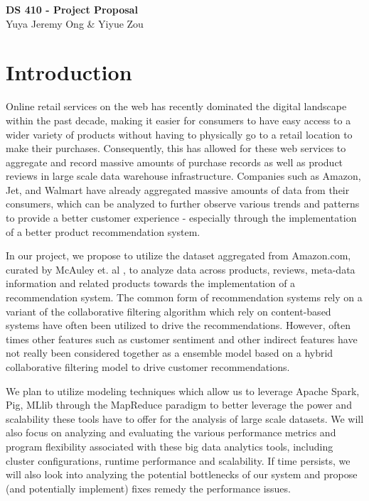 \documentclass[a4paper, 11pt]{article}
\begin{document}
\noindent
\large\textbf{DS 410 - Project Proposal} \\
\normalsize Yuya Jeremy Ong \& Yiyue Zou \\

\section*{Introduction}
Online retail services on the web has recently dominated the digital landscape within the past decade, making it easier for consumers to have easy access to a wider variety of products without having to physically go to a retail location to make their purchases. Consequently, this has allowed for these web services to aggregate and record massive amounts of purchase records as well as product reviews in large scale data warehouse infrastructure. Companies such as Amazon, Jet, and Walmart have already aggregated massive amounts of data from their consumers, which can be analyzed to further observe various trends and patterns to provide a better customer experience - especially through the implementation of a better product recommendation system.

In our project, we propose to utilize the dataset aggregated from Amazon.com, curated by McAuley et. al \cite{McAuley_SIGR15, McAuley_KDD15}, to analyze data across products, reviews, meta-data information and related products towards the implementation of a recommendation system. The common form of recommendation systems rely on a variant of the collaborative filtering algorithm which rely on content-based systems have often been utilized to drive the recommendations. However, often times other features such as customer sentiment and other indirect features have not really been considered together as a ensemble model based on a hybrid collaborative filtering model to drive customer recommendations.

We plan to utilize modeling techniques which allow us to leverage Apache Spark, Pig, MLlib through the MapReduce paradigm to better leverage the power and scalability these tools have to offer for the analysis of large scale datasets. We will also focus on analyzing  and evaluating the various performance metrics and program flexibility associated with these big data analytics tools, including cluster configurations, runtime performance and scalability. If time persists, we will also look into analyzing the potential bottlenecks of our system and propose (and potentially implement) fixes remedy the performance issues.
\end{document}
